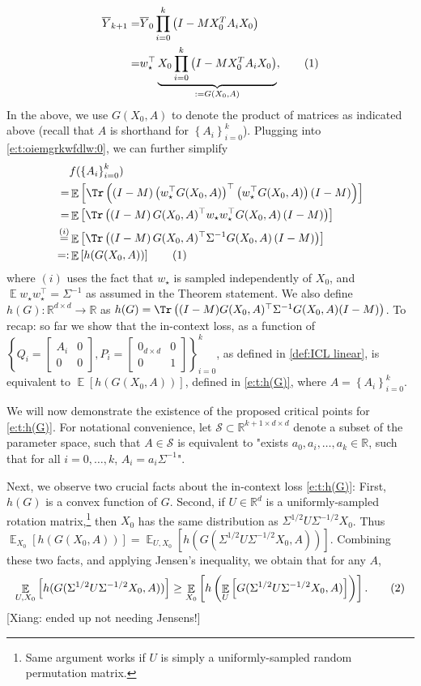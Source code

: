 \documentclass{article}
\DeclareMathOperator{\E}{\mathbb{E}}
\newcommand{\R}{\mathbb{R}}
\renewcommand{\S}{{\mathcal S}}
\newcommand{\wstar}{w_\star}
\newcommand*\lrb[1]{\left[ #1 \right]}
\newcommand*\lrp[1]{\left( #1 \right)}
\newcommand*\lrbb[1]{\left\{ #1 \right\}}
\newcommand\numberthis{\addtocounter{equation}{1}\tag{\theequation}}
\newcommand{\xc}[1]{{\color{black!2!green} [Xiang: #1]}}
\begin{document}
\begin{align*}
\overline{Y}_{k+1} 
=& \overline{Y}_0 \prod_{i=0}^{k} \lrp{I - M X_0^T A_i X_0}\\
=& \wstar^\top \underbrace{X_0 \prod_{i=0}^{k} \lrp{I - M X_0^T A_i X_0}}_{:= G(X_0,A)},
\numberthis \label{e:t:G(X,A)}
\end{align*}
In the above, we use $G(X_0,A)$  to denote the product of matrices as indicated above (recall that $A$ is shorthand for $\lrbb{A_i}_{i=0}^k$). Plugging into \eqref{e:t:oiemgrkwfdlw:0}, we can further simplify
\begin{align*}
& f(\lrbb{A_i}_{i=0}^k) \\
=& \E \lrb{\Tr\lrp{\lrp{I-M} \lrp{\wstar^\top G(X_0,A)}^{\top}\lrp{\wstar^\top G(X_0,A)} \lrp{I-M}}}\\
=& \E \lrb{\Tr\lrp{\lrp{I-M} G(X_0,A)^\top \wstar \wstar^\top G(X_0,A)\lrp{I-M}}}\\
\overset{(i)}{=}& \E \lrb{\Tr\lrp{\lrp{I-M} G(X_0,A)^\top \Sigma^{-1} G(X_0,A)\lrp{I-M}}}\\
=:& \E\lrb{h(G(X_0,A))}
\numberthis \label{e:t:h(G)}
\end{align*}
where $(i)$ uses the fact that $\wstar$ is sampled independently of $X_0$, and $\E{\wstar \wstar^{\top}} = \Sigma^{-1}$ as assumed in the Theorem statement. We also define $h(G): \R^{d \times d} \to \R$ as $h(G) = \Tr\lrp{(I-M) G(X_0,A)^{\top} \Sigma^{-1} G(X_0,A) (I-M)}$. To recap: so far we show that the in-context loss, as a function of $\left\{ Q_i = \begin{bmatrix}
A_i & 0 \\ 
0 & 0
\end{bmatrix}, P_i = \begin{bmatrix}
0_{d\times d} & 0 \\ 
0 & 1 
\end{bmatrix}\right\}_{i=0}^k$, as defined in \eqref{def:ICL linear}, is equivalent to $\E\lrb{h(G(X_0,A))}$, defined in \eqref{e:t:h(G)}, where $A = \lrbb{A_i}_{i=0}^k$. 

We will now demonstrate the existence of the proposed critical points for \eqref{e:t:h(G)}. For notational convenience, let $\S \subset \R^{k+1 \times d \times d}$ denote a subset of the parameter space, such that $A\in \S$ is equivalent to "exists $a_0,a_i,\dots,a_k \in \R$, such that for all $i=0,\dots,k$, $A_i = a_i \Sigma^{-1}$". 

Next, we observe two crucial facts about the in-context loss \eqref{e:t:h(G)}: First, $h(G)$ is a convex function of $G$. Second, if $U \in \R^d$ is a uniformly-sampled rotation matrix,\footnote{Same argument works if $U$ is simply a uniformly-sampled random permutation matrix.} then $X_0$ has the same distribution as $\Sigma^{1/2} U \Sigma^{-1/2} X_0$. Thus $\E_{X_0}\lrb{h(G(X_0,A))} = \E_{U, X_0}\lrb{h(G(\Sigma^{1/2} U \Sigma^{-1/2} X_0,A))}$. Combining these two facts, and applying Jensen's inequality, we obtain that for any $A$,
\begin{align*}
\E_{U, X_0}\lrb{h(G(\Sigma^{1/2} U \Sigma^{-1/2} X_0,A))} \geq \E_{X_0}\lrb{h\lrp{\E_{U}\lrb{G(\Sigma^{1/2} U \Sigma^{-1/2} X_0,A)}}}.
\numberthis \label{e:t:jensen_pnull}
\end{align*}
\xc{ended up not needing Jensens!}
\end{document}
